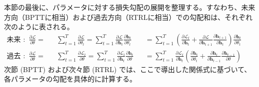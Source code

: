 \documentclass[titlepage]{ltjsbook}
\begin{document}
本節の最後に、パラメータに対する損失勾配の展開を整理する。すなわち、未来方向（BPTTに相当）および過去方向（RTRLに相当）での勾配和は、それぞれ次のように表される。
\begin{equation}
\begin{alignedat}{3}
\text{未来方向勾配和}:\quad&\frac{\partial \mathcal{L}}{\partial \theta} =
&&\sum_{t=1}^T \frac{\partial \mathcal{L}}{\partial \theta_t}
= \sum_{t=1}^T \frac{\partial \mathcal{L}}{\partial \mathbf{h}_t} \frac{\partial \mathbf{h}_t}{\partial \theta_t}
&&= \sum_{t=1}^T \left( \frac{\partial \mathcal{L}_t}{\partial \mathbf{h}_t} + \frac{\partial \mathcal{L}}{\partial \mathbf{h}_{t+1}} \frac{\partial \mathbf{h}_{t+1}}{\partial \mathbf{h}_t} \right) \frac{\partial \mathbf{h}_t}{\partial \theta_t}\\
%
\text{過去方向勾配和}:\quad&\frac{\partial \mathcal{L}}{\partial \theta} =
&&\sum_{t=1}^T \frac{\partial \mathcal{L}_t}{\partial \theta}
= \sum_{t=1}^T \frac{\partial \mathcal{L}_t}{\partial \mathbf{h}_t} \frac{\partial \mathbf{h}_t}{\partial \theta}
&&= \sum_{t=1}^T \frac{\partial \mathcal{L}_t}{\partial \mathbf{h}_t} \left( \frac{\partial \mathbf{h}_t}{\partial \theta_t} + \frac{\partial \mathbf{h}_t}{\partial \mathbf{h}_{t-1}} \frac{\partial \mathbf{h}_{t-1}}{\partial \theta} \right)
&&
\end{alignedat}
\end{equation}
次節 (BPTT) および次々節 (RTRL) では、ここで導出した関係式に基づいて、各パラメータの勾配を具体的に計算する。
\printbibliography[segment=\therefsegment,heading=subbibliography,title={参考文献}]
\end{document}
